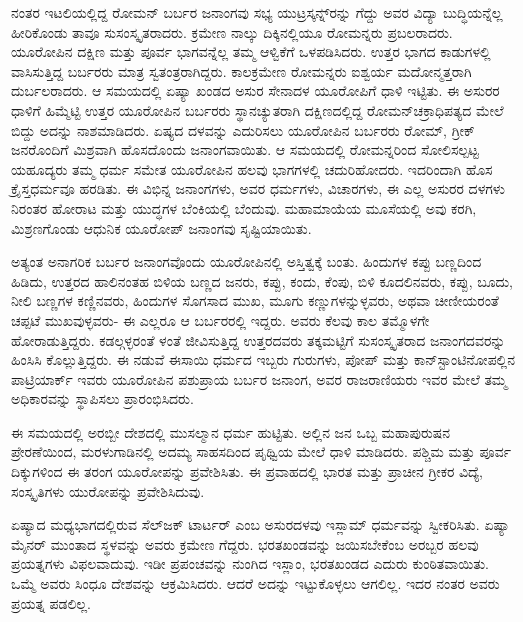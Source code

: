 ನಂತರ ಇಟಲಿಯಲ್ಲಿದ್ದ ರೋಮನ್​ ಬರ್ಬರ ಜನಾಂಗವು ಸಭ್ಯ ಯುಟ್ರಸ್ಕನ್ನ್​ರನ್ನು ಗೆದ್ದು ಅವರ ವಿದ್ಯಾ ಬುದ್ಧಿಯನ್ನೆಲ್ಲ ಹೀರಿಕೊಂಡು ತಾವೂ ಸುಸಂಸ್ಕೃತರಾದರು. ಕ್ರಮೇಣ ನಾಲ್ಕು ದಿಕ್ಕಿನಲ್ಲಿಯೂ ರೋಮನ್ನರು ಪ್ರಬಲರಾದರು. ಯೂರೋಪಿನ ದಕ್ಷಿಣ ಮತ್ತು ಪೂರ್ವ ಭಾಗವನ್ನೆಲ್ಲ ತಮ್ಮ ಆಳ್ವಿಕೆಗೆ ಒಳಪಡಿಸಿದರು. ಉತ್ತರ ಭಾಗದ ಕಾಡುಗಳಲ್ಲಿ ವಾಸಿಸುತ್ತಿದ್ದ ಬರ್ಬರರು ಮಾತ್ರ ಸ್ವತಂತ್ರರಾಗಿದ್ದರು. ಕಾಲಕ್ರಮೇಣ ರೋಮನ್ನರು ಐಶ್ವರ್ಯ ಮದೋನ್ಮತ್ತರಾಗಿ ದುರ್ಬಲರಾದರು. ಆ ಸಮಯದಲ್ಲಿ ಏಷ್ಯಾ ಖಂಡದ ಅಸುರ ಸೇನಾದಳ ಯೂರೋಪಿಗೆ ಧಾಳಿ ಇಟ್ಟಿತು. ಈ ಅಸುರರ ಧಾಳಿಗೆ ಹಿಮ್ಮೆಟ್ಟಿ ಉತ್ತರ ಯೂರೋಪಿನ ಬರ್ಬರರು ಸ್ಥಾನಚ್ಯುತರಾಗಿ ದಕ್ಷಿಣದಲ್ಲಿದ್ದ ರೋಮನ್​ ಚಕ್ರಾಧಿಪತ್ಯದ ಮೇಲೆ ಬಿದ್ದು ಅದನ್ನು ನಾಶಮಾಡಿದರು. ಏಷ್ಯದ ದಳವನ್ನು ಎದುರಿಸಲು ಯೂರೋಪಿನ ಬರ್ಬರರು ರೋಮ್​, ಗ್ರೀಕ್​ ಜನರೊಂದಿಗೆ ಮಿಶ್ರವಾಗಿ ಹೊಸದೊಂದು ಜನಾಂಗ\break ವಾಯಿತು. ಆ ಸಮಯದಲ್ಲಿ ರೋಮನ್ನರಿಂದ ಸೋಲಿಸಲ್ಪಟ್ಟ ಯಹೂದ್ಯರು ತಮ್ಮ ಧರ್ಮ ಸಮೇತ ಯೂರೋಪಿನ ಹಲವು ಭಾಗಗಳಲ್ಲಿ ಚದುರಿಹೋದರು. ಇದರಿಂದಾಗಿ ಹೊಸ ಕ್ರೈಸ್ತಧರ್ಮವೂ ಹರಡಿತು. ಈ ವಿಭಿನ್ನ ಜನಾಂಗಗಳು, ಅವರ ಧರ್ಮಗಳು, ವಿಚಾರಗಳು, ಈ ಎಲ್ಲ ಅಸುರರ ದಳಗಳು ನಿರಂತರ ಹೋರಾಟ ಮತ್ತು ಯುದ್ಧಗಳ ಬೆಂಕಿಯಲ್ಲಿ ಬೆಂದುವು. ಮಹಾಮಾಯೆಯ ಮೂಸೆಯಲ್ಲಿ ಅವು ಕರಗಿ, ಮಿಶ್ರಣಗೊಂಡು ಆಧುನಿಕ ಯೂರೋಪ್​ ಜನಾಂಗವು ಸೃಷ್ಟಿಯಾಯಿತು.

\vskip 5pt

ಅತ್ಯಂತ ಅನಾಗರಿಕ ಬರ್ಬರ ಜನಾಂಗವೊಂದು ಯೂರೋಪಿನಲ್ಲಿ ಅಸ್ತಿತ್ವಕ್ಕೆ ಬಂತು. ಹಿಂದುಗಳ ಕಪ್ಪು ಬಣ್ಣದಿಂದ ಹಿಡಿದು, ಉತ್ತರದ ಹಾಲಿನಂತಹ ಬಿಳಿಯ ಬಣ್ಣದ ಜನರು, ಕಪ್ಪು, ಕಂದು, ಕೆಂಪು, ಬಿಳಿ ಕೂದಲಿನವರು, ಕಪ್ಪು, ಬೂದು, ನೀಲಿ ಬಣ್ಣಗಳ ಕಣ್ಣಿನವರು, ಹಿಂದುಗಳ ಸೊಗಸಾದ ಮುಖ, ಮೂಗು ಕಣ್ಣುಗಳನ್ನುಳ್ಳವರು, ಅಥವಾ ಚೀಣೀಯರಂತೆ ಚಪ್ಪಟೆ ಮುಖವುಳ್ಳವರು- ಈ ಎಲ್ಲರೂ ಆ ಬರ್ಬರರಲ್ಲಿ ಇದ್ದರು. ಅವರು ಕೆಲವು ಕಾಲ ತಮ್ಮೊಳಗೇ ಹೋರಾಡುತ್ತಿದ್ದರು. ಕಡಲ್ಗಳ್ಳರಂತೆ ಳಂತೆ ಜೀವಿಸುತ್ತಿದ್ದ ಉತ್ತರದವರು ತಕ್ಕಮಟ್ಟಿಗೆ ಸುಸಂಸ್ಕೃತರಾದ ಜನಾಂಗದವರನ್ನು ಹಿಂಸಿಸಿ ಕೊಲ್ಲುತ್ತಿದ್ದರು. ಈ ನಡುವೆ ಈಸಾಯಿ ಧರ್ಮದ ಇಬ್ಬರು ಗುರುಗಳು, ಪೋಪ್​ ಮತ್ತು ಕಾನ್​ಸ್ಟಾಂಟಿನೋಪಲ್ಲಿನ ಪಾಟ್ರಿಯಾರ್ಕ್​ ಇವರು ಯೂರೋಪಿನ ಪಶುಪ್ರಾಯ ಬರ್ಬರ ಜನಾಂಗ, ಅವರ ರಾಜರಾಣಿಯರು ಇವರ ಮೇಲೆ ತಮ್ಮ ಅಧಿಕಾರವನ್ನು ಸ್ಥಾಪಿಸಲು ಪ್ರಾರಂಭಿಸಿದರು.

\vskip 5pt

ಈ ಸಮಯದಲ್ಲಿ ಅರಬ್ಬೀ ದೇಶದಲ್ಲಿ ಮುಸಲ್ಮಾನ ಧರ್ಮ ಹುಟ್ಟಿತು. ಅಲ್ಲಿನ ಜನ ಒಬ್ಬ ಮಹಾಪುರುಷನ ಪ್ರೇರಣೆಯಿಂದ, ಮರಳುಗಾಡಿನಲ್ಲಿ ಅದಮ್ಯ ಸಾಹಸದಿಂದ ಪೃಥ್ವಿಯ ಮೇಲೆ ಧಾಳಿ ಮಾಡಿದರು. ಪಶ್ಚಿಮ ಮತ್ತು ಪೂರ್ವ ದಿಕ್ಕುಗಳಿಂದ ಈ ತರಂಗ ಯೂರೋಪನ್ನು ಪ್ರವೇಶಿಸಿತು. ಈ ಪ್ರವಾಹದಲ್ಲಿ ಭಾರತ ಮತ್ತು ಪ್ರಾಚೀನ ಗ್ರೀಕರ ವಿದ್ಯೆ, ಸಂಸ್ಕೃತಿಗಳು ಯುರೋಪನ್ನು ಪ್ರವೇಶಿಸಿದುವು.

\vskip 5pt

ಏಷ್ಯಾದ ಮಧ್ಯಭಾಗದಲ್ಲಿರುವ ಸೆಲ್​ಜಕ್​ ಟಾರ್ಟರ್​ ಎಂಬ ಅಸುರದಳವು ಇಸ್ಲಾಮ್​ ಧರ್ಮವನ್ನು ಸ್ವೀಕರಿಸಿತು. ಏಷ್ಯಾ ಮೈನರ್​ ಮುಂತಾದ ಸ್ಥಳವನ್ನು ಅವರು ಕ್ರಮೇಣ ಗೆದ್ದರು. ಭರತಖಂಡವನ್ನು ಜಯಿಸಬೇಕೆಂಬ ಅರಬ್ಬರ ಹಲವು ಪ್ರಯತ್ನಗಳು ವಿಫಲ\break ವಾದುವು. ಇಡೀ ಪ್ರಪಂಚವನ್ನು ನುಂಗಿದ ಇಸ್ಲಾಂ, ಭರತಖಂಡದ ಎದುರು ಕುಂಠಿತವಾಯಿತು. ಒಮ್ಮೆ ಅವರು ಸಿಂಧೂ ದೇಶವನ್ನು ಆಕ್ರಮಿಸಿದರು. ಆದರೆ ಅದನ್ನು ಇಟ್ಟುಕೊಳ್ಳಲು ಆಗಲಿಲ್ಲ. ಇದರ ನಂತರ ಅವರು ಪ್ರಯತ್ನ ಪಡಲಿಲ್ಲ.

\vskip 5pt

